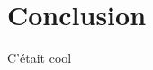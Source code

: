 \section{Conclusion}\label{sec:contrib:runtime:conclusion}

C'était cool~\cite{virouleau:hal-01081974}
